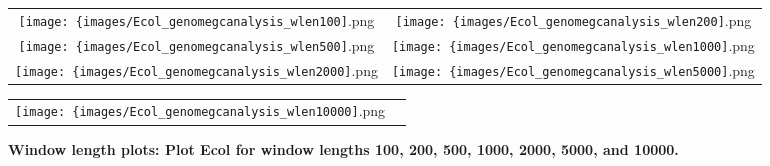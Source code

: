 % 
%
\begin{figure}[!h]

 \begin{center}
 
  \begin{tabular}{cc}
   \texttt{[image: \{images/Ecol\_genomegcanalysis\_wlen100]}.png}	&
   \texttt{[image: \{images/Ecol\_genomegcanalysis\_wlen200]}.png}	\\
   \texttt{[image: \{images/Ecol\_genomegcanalysis\_wlen500]}.png}	&
   \texttt{[image: \{images/Ecol\_genomegcanalysis\_wlen1000]}.png}	\\
   \texttt{[image: \{images/Ecol\_genomegcanalysis\_wlen2000]}.png}	&
   \texttt{[image: \{images/Ecol\_genomegcanalysis\_wlen5000]}.png}	\\
  \end{tabular}
  \begin{tabular}{cc}
   \texttt{[image: \{images/Ecol\_genomegcanalysis\_wlen10000]}.png}	\\
  \end{tabular}
  \parbox{0.7\textwidth}{%
   \caption[Window length plots: Plot Ecol for window lengths 100, 200, 500, 1000, 2000, 5000, and 10000.]{%
   \label{fig:Ecol window length plots}\textbf{Window length plots: Plot Ecol for window lengths 100, 200, 500, 1000, 2000, 5000, and 10000.}
   }%
  }%

 \end{center}
 
\end{figure}



